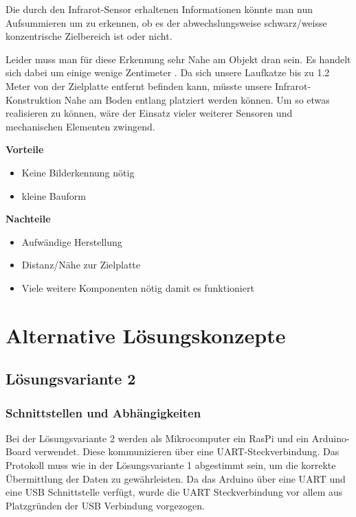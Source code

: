 \documentclass[a4paper]{report}
\begin{document}
Die durch den Infrarot-Sensor erhaltenen Informationen könnte man nun Aufsummieren um zu erkennen, ob es der abwechslungsweise schwarz/weisse konzentrische Zielbereich ist oder nicht.

Leider muss man für diese Erkennung sehr Nahe am Objekt dran sein. Es handelt sich dabei um einige wenige Zentimeter \parencite{Aswinth2017}. Da sich unsere Laufkatze bis zu 1.2 Meter von der Zielplatte entfernt befinden kann, müsste unsere Infrarot-Konstruktion Nahe am Boden entlang platziert werden können. Um so etwas realisieren zu können, wäre der Einsatz vieler weiterer Sensoren und mechanischen Elementen zwingend.

\begin{multicols}{2}
	\textbf{Vorteile}
	\begin{itemize}[label={+},noitemsep]
		\item Keine Bilderkennung nötig
		\item kleine Bauform
	\end{itemize}
	\columnbreak
	\textbf{Nachteile}
	\begin{itemize}[label={-},noitemsep]
		\item Aufwändige Herstellung
		\item Distanz/Nähe zur Zielplatte
		\item Viele weitere Komponenten nötig damit es funktioniert
	\end{itemize}
\end{multicols}

\chapter{Alternative Lösungskonzepte}
\label{app:ch:AltLoesung}
\section{Lösungsvariante 2}
\label{app:sec:Lvar2}
\subsection{Schnittstellen und Abhängigkeiten}
Bei der Lösungsvariante 2 werden als Mikrocomputer ein RasPi und ein Arduino-Board verwendet. Diese kommunizieren über eine UART-Steckverbindung. Das Protokoll muss wie in der Lösungsvariante 1 abgestimmt sein, um die korrekte Übermittlung der Daten zu gewährleisten. Da das Arduino über eine UART und eine USB Schnittstelle verfügt, wurde die UART Steckverbindung vor allem aus Platzgründen der USB Verbindung vorgezogen.
\end{document}
